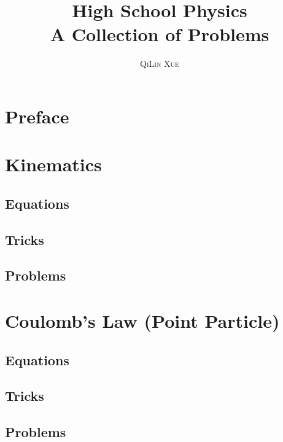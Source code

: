 \documentclass[a4paper,11pt,oneside]{book}
\title{\Huge \textbf{High School Physics} \\ \huge A Collection of Problems}
\author{\textsc{QiLin Xue}}
\begin{document}
\maketitle
\tableofcontents

\chapter*{Preface}


\chapter{Kinematics}


\section{Equations}


\section{Tricks}


\newpage
\section{Problems}


\chapter{Coulomb's Law (Point Particle)}


\section{Equations}


\section{Tricks}


\newpage
\section{Problems}

\end{document}
